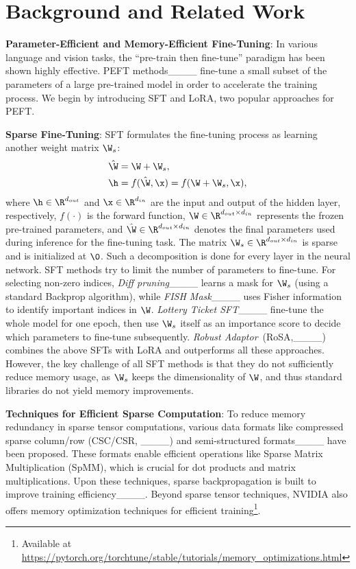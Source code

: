 \section{Background and Related Work}
\label{sec:related}

\textbf{Parameter-Efficient and Memory-Efficient Fine-Tuning}: In various language and vision tasks, the ``pre-train then fine-tune'' paradigm has been shown highly effective. PEFT methods____ fine-tune a small subset of the parameters of a large pre-trained model in order to accelerate the training process. We begin by introducing SFT and LoRA, two popular approaches for PEFT. 

\textbf{Sparse Fine-Tuning}: SFT formulates the fine-tuning process as learning another weight matrix $\W_s$: 
\begin{align}
     &\hat{\W}=\W + \W_s, \label{eq:sft_w}
     \\&\h = f(\hat{\W},\x) = f(\W + \W_s, \x), \label{eq:sft_fwd}
\end{align}
where $\h\in\R^{d_{out}}$ and $\x\in\R^{d_{in}}$ are the input and output of the hidden layer, respectively, $f(\cdot)$ is the forward function, $\W\in \R^{d_{out}\times d_{in}}$ represents the frozen pre-trained parameters, and $\hat{\W}\in \R^{d_{out}\times d_{in}}$ denotes the final parameters used during inference for the fine-tuning task.  %
The matrix $\W_s\in \R^{d_{out}\times d_{in}}$ is sparse and is initialized at $\0$. Such a decomposition is done for every layer in the neural network. SFT methods try to limit the number of parameters to fine-tune. For selecting non-zero indices, \emph{Diff pruning}____ learns a mask for $\W_s$ (using a standard Backprop algorithm), while \emph{FISH Mask}____ uses Fisher information to identify important indices in $\W$. \emph{Lottery Ticket SFT}____ fine-tune the whole model for one epoch, then use $\W_s$ itself as an importance score to decide which parameters to fine-tune subsequently. \emph{Robust Adaptor}~(RoSA,____) combines the above SFTs with LoRA and outperforms all these approaches.
However, the key challenge of all SFT methods is that they do not sufficiently reduce memory usage, as $\W_s$ keeps the dimensionality of $\W$, and thus standard libraries do not yield memory improvements. %

\textbf{Techniques for Efficient Sparse Computation}: To reduce memory redundancy in sparse tensor computations, various data formats like compressed sparse column/row (CSC/CSR, ____) and semi-structured formats____ have been proposed. These formats enable efficient operations like Sparse Matrix Multiplication (SpMM), which is crucial for dot products and matrix multiplications. Upon these techniques, sparse backpropagation is built to improve training efficiency____. Beyond sparse tensor techniques, NVIDIA also offers memory optimization techniques for efficient training\footnote{Available at \url{https://pytorch.org/torchtune/stable/tutorials/memory_optimizations.html}}.

